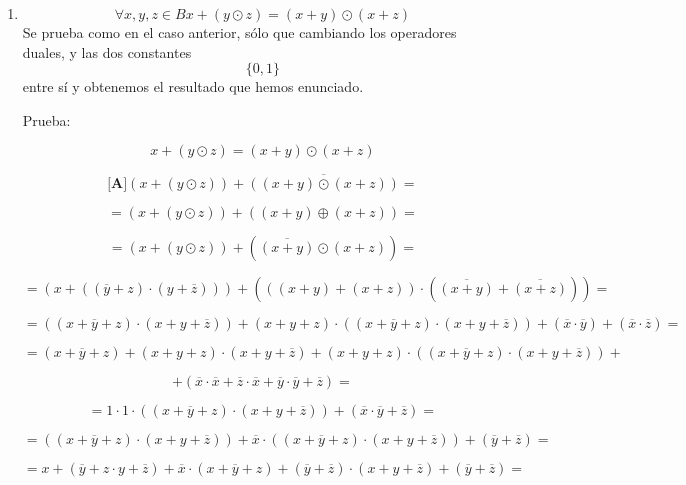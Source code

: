 \begin{enumerate}
\begin{enumerate}
\begin{enumerate}
\begin{enumerate}
        Es seguro que la prueba anterior puede ser acortada
        drásticamente, así que si al\-guno encuentra una forma (quizás
        más directa) la pondremos en su lugar.
      \item
        \[\forall x,y,{z \in B}{{x + {({y \odot z})}} = {({x + y})}} \odot {({x + z})}\]Se
        prueba como en el caso anterior, sólo que cambiando los
        operadores duales, y las dos constantes \[\{{0,1}\}\] entre sí y
        obtenemos el resultado que hemos enunciado.

        Prueba:

        \[{{x + {({y \odot z})}} = {({x + y})}} \odot {({x + z})}\]

        \[{\lbrack\mathbf{A}\rbrack}{{{({x + {({y \odot z})}})} + \overline{({{({x+y})}\odot{({x+z})}})}} =}\]

        \[{= {{({x + {({y \odot z})}})} + {({{({x + y})} \oplus {({x + z})}})}}} =\]

        \[{= {{({x + {({y \odot z})}})} + {({\overline{({x+y})} \odot {({x + z})}})}}} =\]

        \[{= {{({x + {({{({\overline{y} + z})} \cdot {({y + \overline{z}})}})}})} + {({{({{({x + y})} + {({x + z})}})} \cdot {({\overline{({x+y})} + \overline{({x+z})}})}})}}} =\]

        \[{= {{{{({{({{x + \overline{y}} + z})} \cdot {({{x + y} + \overline{z}})}})} + {{({{x + y} + z})} \cdot {({{({{x + \overline{y}} + z})} \cdot {({{x + y} + \overline{z}})}})}}} + {({\overline{x} \cdot \overline{y}})}} + {({\overline{x} \cdot \overline{z}})}}} =\]

        \[= {{{{({{x + \overline{y}} + z})} + {{({{x + y} + z})} \cdot {({{x + y} + \overline{z}})}}} + {{({{x + y} + z})} \cdot {({{({{x + \overline{y}} + z})} \cdot {({{x + y} + \overline{z}})}})}}} +}\]

        \[{+ {({{{{\overline{x} \cdot \overline{x}} + {\overline{z} \cdot \overline{x}}} + {\overline{y} \cdot \overline{y}}} + \overline{z}})}} =\]

        \[{= {{{1 \cdot 1} \cdot {({{({{x + \overline{y}} + z})} \cdot {({{x + y} + \overline{z}})}})}} + {({{\overline{x} \cdot \overline{y}} + \overline{z}})}}} =\]

        \[{= {{{({{({{x + \overline{y}} + z})} \cdot {({{x + y} + \overline{z}})}})} + {\overline{x} \cdot {({{({{x + \overline{y}} + z})} \cdot {({{x + y} + \overline{z}})}})}}} + {({\overline{y} + \overline{z}})}}} =\]

        \[{= {{{{x + {({{\overline{y} + {z \cdot y}} + \overline{z}})}} + {\overline{x} \cdot {({{x + \overline{y}} + z})}}} + {{({\overline{y} + \overline{z}})} \cdot {({{x + y} + \overline{z}})}}} + {({\overline{y} + \overline{z}})}}} =\]


\end{enumerate}
\end{enumerate}
\end{enumerate}
\end{enumerate}
